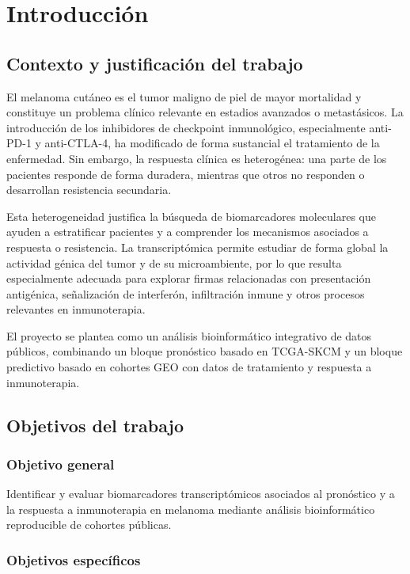 \chapter{Introducción}

\section{Contexto y justificación del trabajo}

El melanoma cutáneo es el tumor maligno de piel de mayor mortalidad y constituye un problema clínico relevante en estadios avanzados o metastásicos. La introducción de los inhibidores de checkpoint inmunológico, especialmente anti-PD-1 y anti-CTLA-4, ha modificado de forma sustancial el tratamiento de la enfermedad. Sin embargo, la respuesta clínica es heterogénea: una parte de los pacientes responde de forma duradera, mientras que otros no responden o desarrollan resistencia secundaria.

Esta heterogeneidad justifica la búsqueda de biomarcadores moleculares que ayuden a estratificar pacientes y a comprender los mecanismos asociados a respuesta o resistencia. La transcriptómica permite estudiar de forma global la actividad génica del tumor y de su microambiente, por lo que resulta especialmente adecuada para explorar firmas relacionadas con presentación antigénica, señalización de interferón, infiltración inmune y otros procesos relevantes en inmunoterapia.

El proyecto se plantea como un análisis bioinformático integrativo de datos públicos, combinando un bloque pronóstico basado en TCGA-SKCM y un bloque predictivo basado en cohortes GEO con datos de tratamiento y respuesta a inmunoterapia.

\section{Objetivos del trabajo}

\subsection{Objetivo general}

Identificar y evaluar biomarcadores transcriptómicos asociados al pronóstico y a la respuesta a inmunoterapia en melanoma mediante análisis bioinformático reproducible de cohortes públicas.

\subsection{Objetivos específicos}

